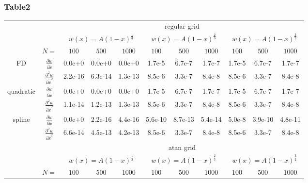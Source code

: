 \subsubsection{Table2}
\begin{tabular}{cc|c|c|c|c|c|c|c|c|c|}
\cline{3-11}
& & \multicolumn{9}{|c|}{regular grid}
\\ \cline{3-11}
& & \multicolumn{3}{|c|}{$w(x)=A(1-x)^\frac{1}{3}$} &  \multicolumn{3}{|c|}{$w(x)=A(1-x)^\frac{2}{3}$} &  \multicolumn{3}{|c|}{$w(x)=A(1-x)^\frac{3}{2}$}
\\ \cline{2-11}
& \multicolumn{1}{|c|}{$N=$} & $100$ & $500$ & $1000$ & $100$ & $500$ & $1000$ & $100$ & $500$ & $1000$
\\ \cline{1-11}
\multicolumn{1}{|c|}{\multirow{2}{*}{FD}} &
\multicolumn{1}{|c|}{$\frac{\partial w}{\partial \tilde x}$}
  &0.0e+0  &0.0e+0  &0.0e+0  &1.7e-5  &6.7e-7  &1.7e-7  &1.7e-5  &6.7e-7  &1.7e-7
\\ \cline{2-11}
\multicolumn{1}{|c|}{}                        &
\multicolumn{1}{|c|}{$\frac{\partial^2 w}{\partial \tilde x^2}$}
  &2.2e-16  &6.3e-14  &1.3e-13  &8.5e-6  &3.3e-7  &8.4e-8  &8.5e-6  &3.3e-7  &8.4e-8
\\ \cline{1-11}
\multicolumn{1}{|c|}{\multirow{2}{*}{quadratic}} &
\multicolumn{1}{|c|}{$\frac{\partial w}{\partial \tilde x}$}
  &0.0e+0  &0.0e+0  &0.0e+0  &1.7e-5  &6.7e-7  &1.7e-7  &1.7e-5  &6.7e-7  &1.7e-7
\\ \cline{2-11}
\multicolumn{1}{|c|}{}                        &
\multicolumn{1}{|c|}{$\frac{\partial^2 w}{\partial \tilde x^2}$}
  &1.1e-14  &1.2e-13  &1.3e-13  &8.5e-6  &3.3e-7  &8.4e-8  &8.5e-6  &3.3e-7  &8.4e-8
\\ \cline{1-11}
\multicolumn{1}{|c|}{\multirow{2}{*}{spline}} &
\multicolumn{1}{|c|}{$\frac{\partial w}{\partial \tilde x}$}
  &0.0e+0  &2.2e-16  &4.4e-16  &5.6e-10  &8.7e-13  &5.4e-14  &5.0e-8  &3.9e-10  &4.8e-11
\\ \cline{2-11}
\multicolumn{1}{|c|}{}                        &
\multicolumn{1}{|c|}{$\frac{\partial^2 w}{\partial \tilde x^2}$}
  &6.6e-14  &4.5e-13  &4.2e-13  &8.5e-6  &3.3e-7  &8.4e-8  &8.5e-6  &3.3e-7  &8.4e-8
\\ \cline{1-11}
& & \multicolumn{9}{|c|}{atan grid}
\\ \cline{3-11}
& & \multicolumn{3}{|c|}{$w(x)=A(1-x)^\frac{1}{3}$} &  \multicolumn{3}{|c|}{$w(x)=A(1-x)^\frac{2}{3}$} &  \multicolumn{3}{|c|}{$w(x)=A(1-x)^\frac{3}{2}$}
\\ \cline{2-11}
& \multicolumn{1}{|c|}{$N=$} & $100$ & $500$ & $1000$ & $100$ & $500$ & $1000$ & $100$ & $500$ & $1000$

\end{tabular}
